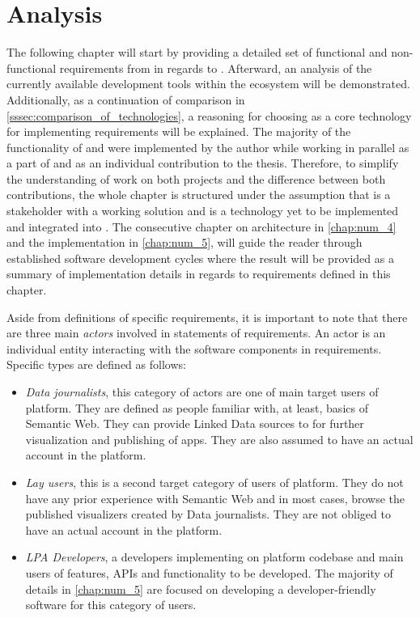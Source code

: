 \chapter{Analysis}
\label{chap:num_3}

The following chapter will start by providing a detailed set of functional and non-functional requirements from \lpa{} in regards to \lpas{}. Afterward, an analysis of the currently available development tools within the \solid{} ecosystem will be demonstrated. Additionally, as a continuation of comparison in \autoref{sssec:comparison_of_technologies}, a reasoning for choosing \solid{} as a core technology for implementing \lpa{} requirements will be explained.  The majority of the functionality of \lpa{} and \lpas{} were implemented by the author while working in parallel as a part of \lpa{} and as an individual contribution to the thesis. Therefore, to simplify the understanding of work on both projects and the difference between both contributions, the whole chapter is structured under the assumption that \lpa{} is a stakeholder with a working solution and \lpas{} is a technology yet to be implemented and integrated into \lpa{}. The consecutive chapter on architecture in \autoref{chap:num_4} and the implementation in \autoref{chap:num_5}, will guide the reader through established software development cycles where the result will be provided as a summary of implementation details in regards to requirements defined in this chapter.

Aside from definitions of specific requirements, it is important to note that there are three main \textit{actors} involved in statements of requirements. An actor is an individual entity interacting with the software components in requirements. Specific types are defined as follows:
\begin{itemize}
    \item \textit{Data journalists}, this category of actors are one of main target users of \lpa{} platform. They are defined as people familiar with, at least, basics of Semantic Web. They can provide Linked  Data sources to \lpa{} for further visualization and publishing of apps. They are also assumed to have an actual account in the \lpa{} platform.
    \item \textit{Lay users}, this is a second target category of users of \lpa{} platform. They do not have any prior experience with Semantic Web and in most cases, browse the published visualizers created by Data journalists. They are not obliged to have an actual account in the \lpa{} platform.
    \item \textit{\gls{LPA} Developers}, a developers implementing on \lpa{} platform codebase and main users of \lpas{} features, APIs and functionality to be developed. The majority of details in \autoref{chap:num_5} are focused on developing a developer-friendly software for this category of users.
\end{itemize}

